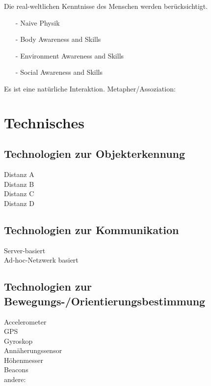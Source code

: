 \checkbox{\realworld} Die real-weltlichen Kenntnisse des Menschen werden berücksichtigt.
\begin{itemize}
\item[-] \checkbox{\realworldA} Naive Physik
\item[-] \checkbox{\realworldB} Body Awareness and Skills
\item[-] \checkbox{\realworldC} Environment Awareness and Skills
\item[-] \checkbox{\realworldD} Social Awareness and Skills
\end{itemize}

\checkbox{\metaphor} Es ist eine natürliche Interaktion. Metapher/Assoziation: 


\section*{Technisches}

\subsection*{Technologien zur Objekterkennung}
\checkbox{\technologyObjectA} Distanz A \\
\checkbox{\technologyObjectB} Distanz B \\
\checkbox{\technologyObjectC} Distanz C \\
\checkbox{\technologyObjectD} Distanz D \\

\technologyObjectDesc

\subsection*{Technologien zur Kommunikation}
\checkbox{\technologyCommunicationServer} Server-basiert \\
\checkbox{\technologyCommunicationAdhoc} Ad-hoc-Netzwerk basiert\\

\technologyCommunicationDesc

\subsection*{Technologien zur Bewegungs-/Orientierungsbestimmung}
\checkbox{\technologyOrientationAccelerometer} Accelerometer \\
\checkbox{\technologyOrientationGPS} GPS \\
\checkbox{\technologyOrientationGyroskop} Gyroskop \\
\checkbox{\technologyOrientationAnnaeherung} Annäherungssensor \\
\checkbox{\technologyOrientationHoehe} Höhenmesser \\
\checkbox{\technologyOrientationBeacons} Beacons \\
\checkbox{\technologyOrientationOther} andere: \\

